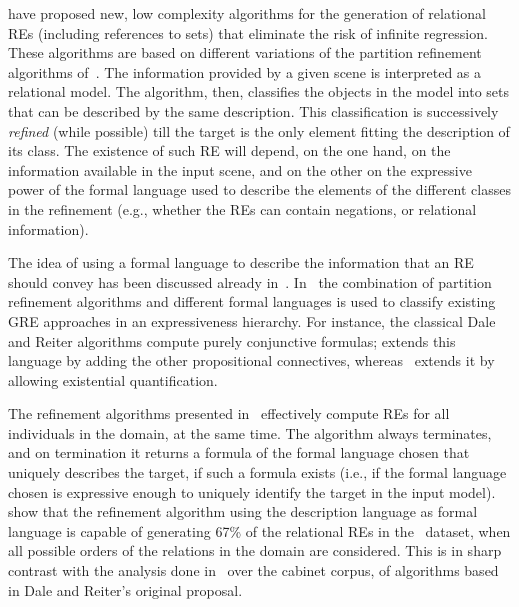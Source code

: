  have proposed new, low complexity algorithms for the generation 
of relational REs (including references to sets) that eliminate the risk of infinite regression. 
These algorithms are based on different variations of the partition refinement algorithms of~.
The information provided by a given scene is interpreted as a relational model.  The algorithm, then, classifies the 
objects in the model  into sets that can 
be described by the same description.  This classification is successively \emph{refined} (while possible) till the target 
is the only element fitting the description of its class.  The existence of such RE will 
depend, on the one hand, on the information available in the input scene, and on the other 
on the expressive power of the formal language used to describe the elements of the different 
classes in the refinement (e.g., whether the REs can contain negations, or relational information). 

The idea of using a formal language to describe the information that an RE should convey has been discussed 
already in~\cite{Krahmer2003,gardent07:_gener_bridg_defin_descr}.  In~\cite{arec2:2008:Areces,arec:usin11} the 
combination of partition refinement algorithms and different formal languages is used to classify existing 
GRE approaches in an expressiveness hierarchy.  For instance, the classical Dale and Reiter algorithms
compute purely conjunctive formulas; \cite{deemter02:_gener_refer_expres} extends this language by
adding the other propositional connectives, whereas~\cite{dale91:_gener_refer_expres_invol_relat} extends it by
allowing existential quantification.

The refinement algorithms presented in~\cite{arec2:2008:Areces,arec:usin11} effectively
compute REs for all individuals in the domain, at the same time.  The algorithm always terminates, and on termination it returns a formula of 
the formal language chosen that uniquely describes the target, if such a formula exists (i.e., if the 
formal language chosen is expressive enough to uniquely identify the target in the input model). 
show that the refinement algorithm using the description language \el as formal language is capable of generating 67\% of 
the relational REs in the~\cite{viethen06:_algor_for_gener_refer_expres} dataset, when all possible orders of the relations in the domain are considered. This is in sharp contrast with the analysis 
done in~\cite{viethen06:_algor_for_gener_refer_expres} over the cabinet corpus, of algorithms based in Dale and Reiter's original proposal.    

